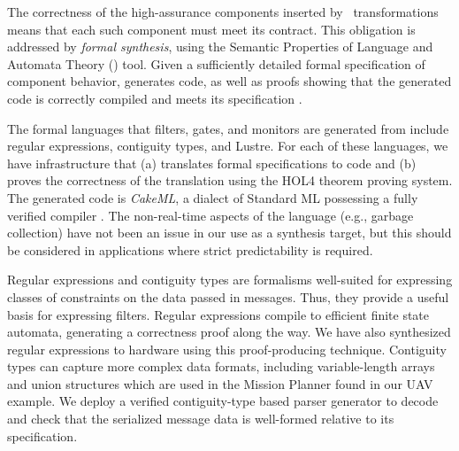 The correctness of the high-assurance components inserted
by \briefcase \ transformations means that each such component
must meet its \agree{} contract. This obligation is addressed by
\emph{formal synthesis}, using the Semantic Properties of Language
and Automata Theory (\splat) tool.  Given a sufficiently detailed formal
specification of component behavior, \splat{} generates code,
as well as proofs showing that the generated code is
correctly compiled and meets its specification \cite{case-models-2021}.

The formal languages that filters, gates, and monitors are generated
from include regular expressions, contiguity types, and Lustre.
For each of these languages, we have infrastructure
that (a) translates formal specifications to code and (b) proves the
correctness of the translation using the HOL4 theorem proving system.
The generated code is \emph{CakeML}, a dialect of Standard ML
possessing a fully verified compiler \cite{cakeml}. The non-real-time 
aspects of the language (e.g., garbage collection) have not been 
an issue in our use as a synthesis target, but this should be 
considered in applications where strict predictability is required. 


Regular expressions and contiguity types are formalisms well-suited
for expressing classes of constraints on the data passed in
messages. Thus, they provide a useful basis for expressing
filters. Regular expressions compile to efficient finite state
automata, generating a correctness proof along the way.
We have also synthesized regular
expressions to hardware using this proof-producing
technique.
Contiguity types can capture more complex
data formats, including variable-length arrays and union structures
which are used in the Mission Planner found in our UAV example.
We deploy a verified contiguity-type based parser generator
to decode and check that the serialized message data is well-formed
relative to its specification.

